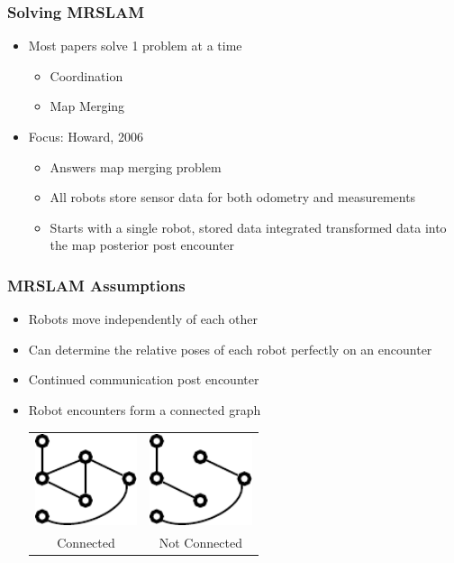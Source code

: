 \begin{frame}
\frametitle{Solving MRSLAM}
\begin{itemize}
\item Most papers solve 1 problem at a time
\begin{itemize}
\item Coordination
\item Map Merging
\end{itemize}
\item Focus: Howard, 2006
\begin{itemize}
\item Answers map merging problem
\item All robots store sensor data for both odometry and measurements
\item Starts with a single robot, stored data integrated transformed data into the map posterior post encounter

\end{itemize}

\end{itemize}
\end{frame}


\begin{frame}
\frametitle{MRSLAM Assumptions}
\begin{itemize}
\item Robots move independently of each other
\item Can determine the relative poses of each robot perfectly on an encounter
\item Continued communication post encounter
\item Robot encounters form a connected graph
\begin{center}
\begin{tabular}{cc}
\includegraphics[width=3cm]{../FiguresAndMovies/ConnectedGraph}&\includegraphics[width=3cm]{../FiguresAndMovies/NonConnected}\\
Connected & Not Connected
\end{tabular}
\end{center}
\end{itemize}
\end{frame}



